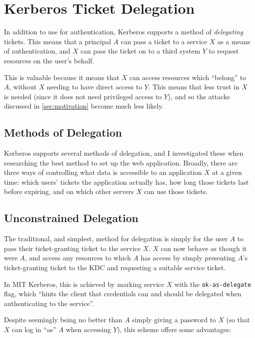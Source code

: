 \documentclass[12pt]{report}
\begin{document}
\section{Kerberos Ticket Delegation}
\label{sec:kerberos_ticket_delegation}
In addition to use for authentication, Kerberos supports a method of \textit{delegating} tickets. This means that a principal $A$ can pass a ticket to a service $X$ as a means of authentication, and $X$ can pass the ticket on to a third system $Y$ to request resources on the user's behalf.

This is valuable because it means that $X$ can access resources which ``belong'' to $A$, without $X$ needing to have direct access to $Y$. This means that less trust in $X$ is needed (since it does not need privileged access to $Y$), and so the attacks discussed in \autoref{sec:motivation} become much less likely.

\subsection{Methods of Delegation}
Kerberos supports several methods of delegation, and I investigated these when researching the best method to set up the web application. Broadly, there are three ways of controlling what data is accessible to an application $X$ at a given time: which users' tickets the application actually has, how long those tickets last before expiring, and on which other servers $X$ can use those tickets.

\subsection{Unconstrained Delegation}
The traditional, and simplest, method for delegation is simply for the user $A$ to pass their ticket-granting ticket to the service $X$. $X$ can now behave as though it were $A$, and access any resources to which $A$ has access by simply presenting $A$'s ticket-granting ticket to the KDC and requesting a suitable service ticket\cite{JohnKol-unconstrained-deleg}.

In MIT Kerberos, this is achieved by marking service $X$ with the \verb+ok-as-delegate+ flag, which ``hints the client that credentials can and should be delegated when authenticating to the service''\cite{KDC-conf-docs}.

Despite seemingly being no better than $A$ simply giving a password to $X$ (so that $X$ can log in ``as'' $A$ when accessing $Y$), this scheme offers some advantages:
\end{document}
